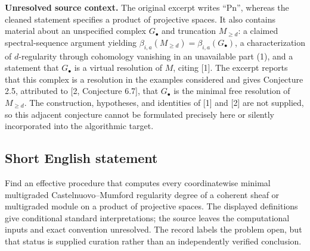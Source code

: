 \documentclass[11pt]{article}
\begin{document}
\textbf{Unresolved source context.} The original excerpt writes ``Pn'', whereas the cleaned statement specifies a product of projective spaces. It also contains material about an unspecified complex \(G_\bullet\) and truncation \(M_{\geq d}\): a claimed spectral-sequence argument yielding \(\beta_{i,a}(M_{\geq d})=\beta_{i,a}(G_\bullet)\), a characterization of \(d\)-regularity through cohomology vanishing in an unavailable part (1), and a statement that \(G_\bullet\) is a virtual resolution of \(M\), citing [1]. The excerpt reports that this complex is a resolution in the examples considered and gives Conjecture 2.5, attributed to [2, Conjecture 6.7], that \(G_\bullet\) is the minimal free resolution of \(M_{\geq d}\). The construction, hypotheses, and identities of [1] and [2] are not supplied, so this adjacent conjecture cannot be formulated precisely here or silently incorporated into the algorithmic target.
\subsection{Short English statement}
Find an effective procedure that computes every coordinatewise minimal multigraded Castelnuovo--Mumford regularity degree of a coherent sheaf or multigraded module on a product of projective spaces. The displayed definitions give conditional standard interpretations; the source leaves the computational inputs and exact convention unresolved. The record labels the problem open, but that status is supplied curation rather than an independently verified conclusion.
\end{document}
